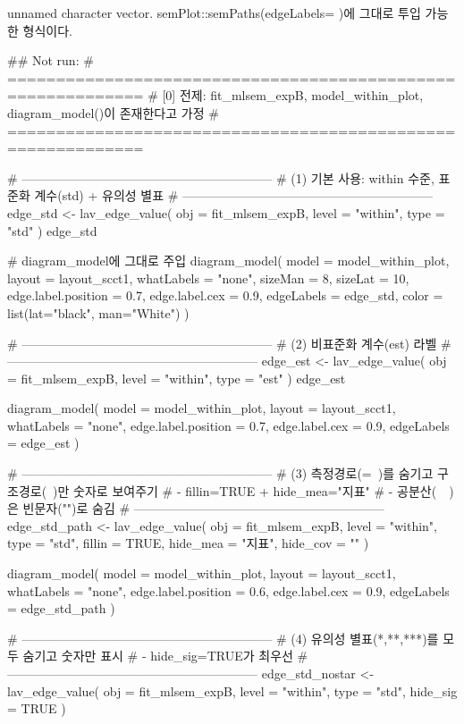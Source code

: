 \documentclass[a4paper]{book}
\begin{document}
%
\begin{Value}
unnamed character vector.
semPlot::semPaths(edgeLabels= )에 그대로 투입 가능한 형식이다.
\end{Value}
%
\begin{Examples}
\begin{ExampleCode}
## Not run: 
# ============================================================
# [0] 전제: fit_mlsem_expB, model_within_plot, diagram_model()이 존재한다고 가정
# ============================================================

# ------------------------------------------------------------
# (1) 기본 사용: within 수준, 표준화 계수(std) + 유의성 별표
# ------------------------------------------------------------
edge_std <- lav_edge_value(
  obj   = fit_mlsem_expB,
  level = "within",
  type  = "std"
)
edge_std

# diagram_model에 그대로 주입
diagram_model(
  model      = model_within_plot,
  layout     = layout_scct1,
  whatLabels = "none",
  sizeMan    = 8,
  sizeLat    = 10,
  edge.label.position = 0.7,
  edge.label.cex      = 0.9,
  edgeLabels = edge_std,
  color = list(lat="black", man="White")
)

# ------------------------------------------------------------
# (2) 비표준화 계수(est) 라벨
# ------------------------------------------------------------
edge_est <- lav_edge_value(
  obj   = fit_mlsem_expB,
  level = "within",
  type  = "est"
)
edge_est

diagram_model(
  model      = model_within_plot,
  layout     = layout_scct1,
  whatLabels = "none",
  edge.label.position = 0.7,
  edge.label.cex      = 0.9,
  edgeLabels = edge_est
)

# ------------------------------------------------------------
# (3) 측정경로(=~)를 숨기고 구조경로(~)만 숫자로 보여주기
#     - fillin=TRUE + hide_mea="지표"
#     - 공분산(~~)은 빈문자("")로 숨김
# ------------------------------------------------------------
edge_std_path <- lav_edge_value(
  obj      = fit_mlsem_expB,
  level    = "within",
  type     = "std",
  fillin   = TRUE,
  hide_mea = "지표",
  hide_cov = ""
)

diagram_model(
  model      = model_within_plot,
  layout     = layout_scct1,
  whatLabels = "none",
  edge.label.position = 0.6,
  edge.label.cex      = 0.9,
  edgeLabels = edge_std_path
)

# ------------------------------------------------------------
# (4) 유의성 별표(*,**,***)를 모두 숨기고 숫자만 표시
#     - hide_sig=TRUE가 최우선
# ------------------------------------------------------------
edge_std_nostar <- lav_edge_value(
  obj      = fit_mlsem_expB,
  level    = "within",
  type     = "std",
  hide_sig = TRUE
)


\end{ExampleCode}
\end{Examples}
\end{document}

